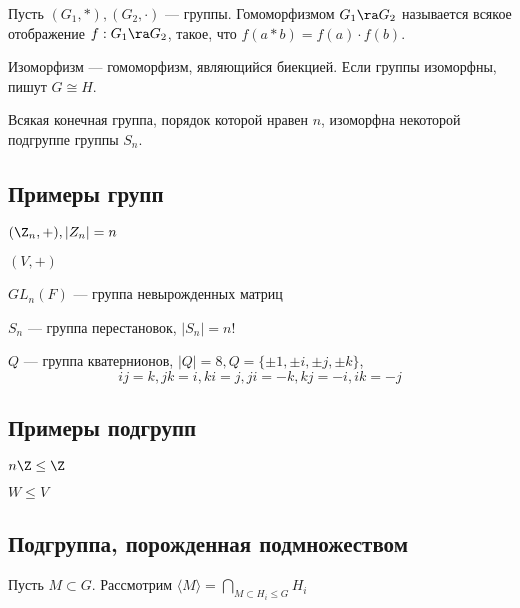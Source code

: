 \begin{definition}
    Пусть \((G_1, *), (G_2, \cdot)\) --- группы. Гомоморфизмом \(G_1 \ra G_2\) называется всякое отображение \(f: G_1 \ra G_2\), такое, что \(f(a * b) = f(a) \cdot f(b)\).
\end{definition}

\begin{definition}
    Изоморфизм --- гомоморфизм, являющийся биекцией. Если группы изоморфны, пишут \(G \cong H\).
\end{definition}

\begin{theorem}[Кэли]
    Всякая конечная группа, порядок которой нравен \(n\), изоморфна некоторой подгруппе группы \(S_n\).
\end{theorem}

\subsection{Примеры групп}
\begin{example}
    \((\Z_n, +), |Z_n| = n\)
\end{example}

\begin{example}
    \((V, +)\)
\end{example}

\begin{example}
    \(GL_n(F)\) --- группа невырожденных матриц
\end{example}

\begin{example}
    \(S_n\) --- группа перестановок, \(|S_n| = n!\)
\end{example}

\begin{example}
    \(Q\) --- группа кватернионов, \(|Q| = 8, Q = \{\pm 1, \pm i, \pm j, \pm k\}\),
    \[ij = k, jk = i, ki = j, ji = -k, kj = -i, ik = -j\]
\end{example}

\subsection{Примеры подгрупп}
\begin{example}
    \(n\Z \le \Z\)
\end{example}

\begin{example}
    \(W \le V\)
\end{example}

\subsection{Подгруппа, порожденная подмножеством}
Пусть \(M \subset G\). Рассмотрим \(\langle M \rangle = \bigcap_{M \subset H_i \le G} H_i\)

